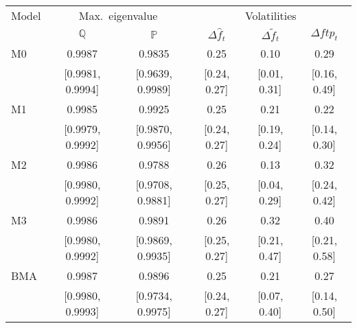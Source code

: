 \begin{tabular}{l|cc|ccc} \hline \hline 
Model & \multicolumn{2}{c|}{Max.~eigenvalue} & \multicolumn{3}{c}{Volatilities} \\ 
      & $\mathds{Q}$ & $\mathds{P}$ & $\Delta \hat{f}_t$ & $\Delta \tilde{f}_t$ & $\Delta ftp_t$ \\ \hline 
M0& 0.9987  & 0.9835  & 0.25  & 0.10  & 0.29  \\ 
& [0.9981, 0.9994]& [0.9639, 0.9989]& [0.24, 0.27]& [0.01, 0.31]& [0.16, 0.49]\\ 
 \hline 
M1& 0.9985  & 0.9925  & 0.25  & 0.21  & 0.22  \\ 
& [0.9979, 0.9992]& [0.9870, 0.9956]& [0.24, 0.27]& [0.19, 0.24]& [0.14, 0.30]\\ 
 \hline 
M2& 0.9986  & 0.9788  & 0.26  & 0.13  & 0.32  \\ 
& [0.9980, 0.9992]& [0.9708, 0.9881]& [0.25, 0.27]& [0.04, 0.29]& [0.24, 0.42]\\ 
 \hline 
M3& 0.9986  & 0.9891  & 0.26  & 0.32  & 0.40  \\ 
& [0.9980, 0.9992]& [0.9869, 0.9935]& [0.25, 0.27]& [0.21, 0.47]& [0.21, 0.58]\\ 
 \hline 
BMA& 0.9987  & 0.9896  & 0.25  & 0.21  & 0.27  \\ 
& [0.9980, 0.9993]& [0.9734, 0.9975]& [0.24, 0.27]& [0.07, 0.40]& [0.14, 0.50]\\ 
 \hline 
\hline 
 \end{tabular}
